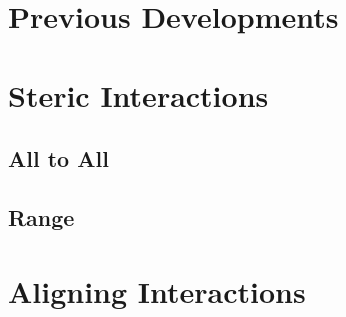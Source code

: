 \documentclass[../master_thesis_np.tex]{subfiles}
\begin{document}
	\section{Previous Developments}
	\section{Steric Interactions}
	\subsection{All to All}
	\subsection{Range}
	\section{Aligning Interactions}
\end{document}

